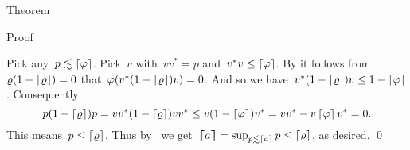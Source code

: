 \documentclass[b]{subfiles}
\begin{document}
\begin{parsec}
\begin{point}{Theorem}
\begin{point}{Proof}
\begin{point}
Pick any~$p \lesssim \left\lceil\varphi\right\rceil$.
Pick~$v$ with~$vv^* = p$ and~$v^*v \leq \left\lceil\varphi\right\rceil$.
By 
it follows from~$\varrho(1-\left\lceil\varrho\right\rceil) = 0$
that~$\varphi(v^* (1-\left\lceil\varrho\right\rceil)v)=0$.
And so we have~$v^* (1-\left\lceil\varrho\right\rceil)v \leq 1-\left\lceil\varphi\right\rceil$.
Consequently
\begin{equation*}
p (1-\left\lceil\varrho\right\rceil) p
    =    vv^* (1 - \left\lceil\varrho\right\rceil) vv^*
    \leq v (1- \left\lceil\varphi\right\rceil) v^*
    = vv^* - v \left\lceil\varphi\right\rceil v^* = 0.
\end{equation*}
This means~$p \leq \left\lceil\varrho\right\rceil$.
Thus by~
we get~$\left\lceil\!\!\left\lceil a\right\rceil\!\!\right\rceil = \sup_{p \lesssim \left\lceil a\right\rceil} p \leq \left\lceil\varrho\right\rceil$,
as desired. \qed
\end{point}
\end{point}
\end{point}
\end{parsec}
\end{document}
